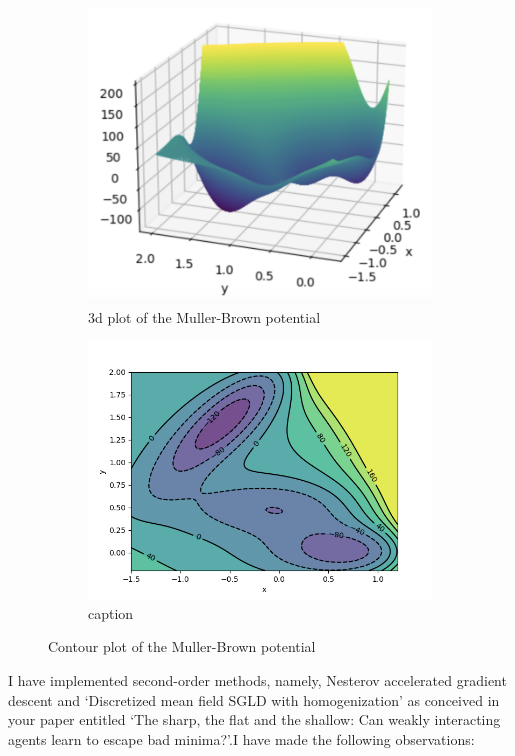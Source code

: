 \documentclass{article}
\begin{document}
    \begin{figure}[H]
\begin{subfigure}{0.5\textwidth}
  \centering
  \includegraphics[width=0.8\linewidth]{images/MullerB-potential-plot-3d.png}
  \caption{3d plot of the Muller-Brown potential}
  \label{fig: muller-brown 3d}
\end{subfigure}%
\begin{subfigure}{0.5\textwidth}
  \centering
  \includegraphics[width=0.8\linewidth]{images/MullerB-contour-with-grad-field.png}
  \caption{ caption}
  \label{fig:  muller-brown contour}
\end{subfigure}
\caption{Contour plot of the Muller-Brown potential}
\label{fig:  muller-brown plots}
\end{figure}

I have implemented second-order methods, namely, Nesterov accelerated gradient descent and ‘Discretized mean field SGLD with homogenization’ as conceived in your paper entitled ‘The sharp, the flat and the shallow: Can weakly interacting agents learn to escape bad minima?’.I have made the following observations:
\end{document}
